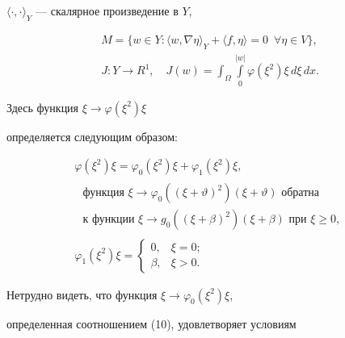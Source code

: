 ${\langle \cdot, \cdot \rangle }_{Y} $ --- скалярное произведение в $Y$,


\begin{gather*}


M=\{w\in Y:\langle w,\nabla\eta\rangle_{Y} + \langle f,\eta\rangle = 0 


\ \;\forall \eta \in V\}, \\


J: Y \to R^{1},\quad


J(w) = \int_{\Omega } \int \limits^{| w | }_{0}


\varphi(\xi^{2})\xi\, d\xi\, dx.


\end{gather*}


Здесь функция $\xi \to \varphi(\xi^{2})\xi $ 


определяется следующим образом:


\begin{gather}


\varphi(\xi^{2})\xi = \varphi_{0}(\xi^{2})\xi + \varphi_{1}(\xi^{2})\xi,\\


%


\begin{split}


\text{ функция } \xi \to 


\varphi_{0}((\xi + \vartheta )^{2})(\xi + \vartheta ) \text{ обратна } \\


\mbox { к функции } {\xi \to


g_{0}((\xi + \beta )^{2})(\xi + \beta )} \text{ при } \xi \ge 0,


\end{split}


\\


\varphi_{1}(\xi^{2})\xi =


\begin{cases}


0, &\xi = 0; \\


\beta, & \xi >0.


\end{cases}


\end{gather}


Нетрудно видеть, что функция $\xi \to \varphi_{0}(\xi^{2})\xi $, 


определенная соотношением (10), удовлетворяет условиям


